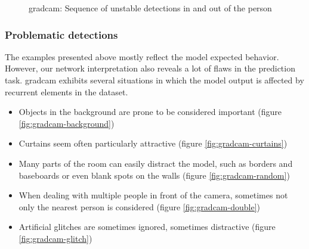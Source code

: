 \begin{figure}[!h]
\begin{center}
\begin{subfigure}[h]{0.24\textwidth}
		\end{subfigure}
	\end{center}
	\vspace{-0.5cm}
	\caption[\gls{gradcam}: Sequence of unstable detections in and out of the person]{\gls{gradcam}: Sequence of unstable detections in and out of the person}
	\label{fig:gradcam-seq-beard}
\end{figure}

\subsubsection*{Problematic detections}

The examples presented above mostly reflect the model expected behavior. However, our network interpretation also reveals a lot of flaws in the prediction task. \gls{gradcam} exhibits several situations in which the model output is affected by recurrent elements in the dataset.

\begin{itemize}
	\item Objects in the background are prone to be considered important (figure \ref{fig:gradcam-background})
	\item Curtains seem often particularly attractive (figure \ref{fig:gradcam-curtains})
	\item Many parts of the room can easily distract the model, such as borders and baseboards or even blank spots on the walls (figure \ref{fig:gradcam-random})
	\item When dealing with multiple people in front of the camera, sometimes not only the nearest person is considered (figure \ref{fig:gradcam-double})
	\item Artificial glitches are sometimes ignored, sometimes distractive (figure \ref{fig:gradcam-glitch})
\end{itemize}

